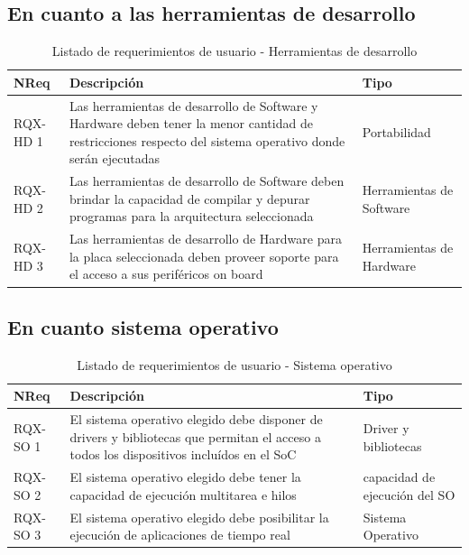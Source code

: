 		\newpage
			
		\subsection{En cuanto a las herramientas de desarrollo}
		\begin{table}[h]
		\centering
		\begin{tabular}{ p{2.5cm} p{8cm} p{3cm} }
		\hline 
		\rowcolor[gray]{0.8} N\textordmasculine Req & Descripción  & Tipo\\
		\hline 
		RQX-HD 1 &  Las herramientas de desarrollo de Software y Hardware deben tener la menor cantidad de restricciones respecto del sistema operativo donde serán ejecutadas & Portabilidad\\
		\hline 
		RQX-HD 2 &  Las herramientas de desarrollo de Software deben brindar la capacidad de compilar y depurar programas para la arquitectura seleccionada &
		Herramientas de Software\\
		\hline
		RQX-HD 3 &  Las herramientas de desarrollo de Hardware para la placa seleccionada deben proveer soporte para el acceso a sus periféricos on board &
		Herramientas de Hardware\\ 
		\hline 
		\end{tabular}
		\caption{Listado de requerimientos de usuario - Herramientas de desarrollo}
		\label{tab:requsr3}
		\end{table}
		
		\subsection{En cuanto sistema operativo} 	 
		\begin{table}[h]
		\centering
		\begin{tabular}{ p{2.5cm} p{8cm} p{3cm} }
		\hline 
		\rowcolor[gray]{0.8} N\textordmasculine Req & Descripción  & Tipo\\
		\hline 
		RQX-SO 1 &  El sistema operativo elegido debe disponer de drivers y bibliotecas que permitan el acceso a todos los dispositivos incluídos en el SoC &
		Driver y bibliotecas\\
		\hline 
		RQX-SO 2 &  El sistema operativo elegido debe tener la capacidad de ejecución multitarea e hilos & capacidad de ejecución del SO\\ 
		\hline
		RQX-SO 3 &  El sistema operativo elegido debe posibilitar la ejecución de aplicaciones de tiempo real & Sistema Operativo\\ 
		\hline 
		\end{tabular}
		\caption{Listado de requerimientos de usuario - Sistema operativo}
		\label{tab:requsr4}
		\end{table}
	
